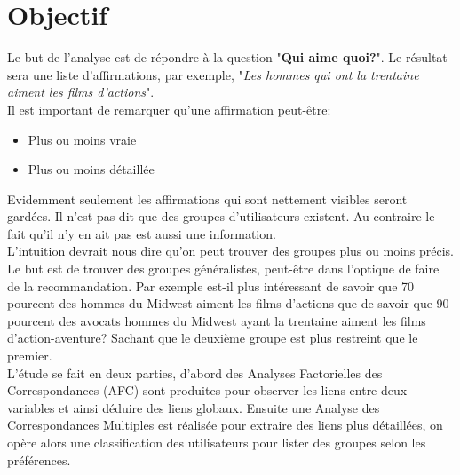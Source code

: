 \chapter{Objectif}

Le but de l'analyse est de répondre à la question "\textbf{Qui aime quoi?}". Le résultat sera une liste d'affirmations, par exemple, "\emph{Les hommes qui ont la trentaine aiment les films d'actions}".
\bigskip
\\Il est important de remarquer qu'une affirmation peut-être:
\begin{itemize}
  \item Plus ou moins vraie
  \item Plus ou moins détaillée
\end{itemize}
Evidemment seulement les affirmations qui sont nettement visibles seront gardées. Il n'est pas dit que des groupes d'utilisateurs existent. Au contraire le fait qu'il n'y en ait pas est aussi une information.
\bigskip
\\L'intuition devrait nous dire qu'on peut trouver des groupes plus ou moins précis. Le but est de trouver des groupes généralistes, peut-être dans l'optique de faire de la recommandation. Par exemple est-il plus intéressant de savoir que 70 pourcent des hommes du Midwest aiment les films d'actions que de savoir que 90 pourcent des avocats hommes du Midwest ayant la trentaine aiment les films d'action-aventure? Sachant que le deuxième groupe est plus restreint que le premier.
\bigskip
\\L'étude se fait en deux parties, d'abord des Analyses Factorielles des Correspondances (AFC) sont produites pour observer les liens entre deux variables et ainsi déduire des liens globaux. Ensuite une Analyse des Correspondances Multiples est réalisée pour extraire des liens plus détaillées, on opère alors une classification des utilisateurs pour lister des groupes selon les préférences.